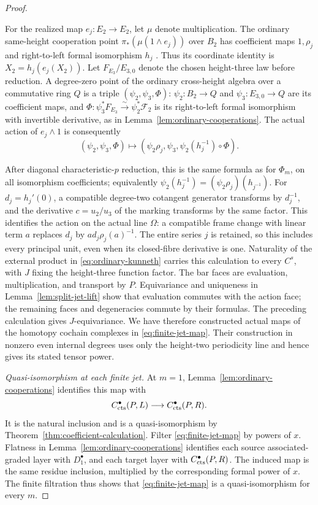 \begin{proof}
\begin{samepage}
For the realized map \(e_j:E_2\to E_2\), let \(\mu\) denote multiplication.
The ordinary same-height cooperation point
\(\pi_*(\mu(1\wedge e_j))\) over \(B_2\) has coefficient maps
\(1,\rho_j\) and right-to-left formal isomorphism \(h_j\)
\citep[Proposition~7.3, Equation~(7.3), and Corollary~7.7]{GH04}.
Thus its coordinate identity is \(X_2=h_j(e_j(X_2))\). Let
\(F_{E_3}/E_{3,0}\) denote the chosen height-three law before reduction.
A degree-zero point of the ordinary cross-height algebra over a commutative
ring \(Q\) is a triple \((\psi_2,\psi_3,\Phi)\):
\(\psi_2:B_2\to Q\) and \(\psi_3:E_{3,0}\to Q\) are its
coefficient maps, and
\(\Phi:\psi_3^*F_{E_3}\xrightarrow{\sim}\psi_2^*\mathcal F_2\)
is its right-to-left formal isomorphism with invertible derivative, as in
Lemma~\ref{lem:ordinary-cooperations}. The actual action of
\(e_j\wedge1\) is consequently
\[
 (\psi_2,\psi_3,\Phi)\longmapsto
       (\psi_2\rho_j,\psi_3,\psi_2(h_j^{-1})\circ\Phi).
\]
\end{samepage}
After diagonal characteristic-\(p\) reduction, this is the same formula
as for \(\Phi_m\), on all isomorphism coefficients; equivalently
\(\psi_2(h_j^{-1})=(\psi_2\rho_j)(h_{j^{-1}})\).
For \(d_j=h_j'(0)\), a compatible degree-two cotangent generator
transforms by \(d_j^{-1}\), and the derivative \(c=u_2/u_3\) of the
marking transforms by the same factor. This identifies the action on
the actual line \(\Omega\): a compatible frame change with linear term
\(a\) replaces \(d_j\) by \(a d_j\rho_j(a)^{-1}\).
The entire series \(j\) is retained, so this includes every principal
unit, even when its closed-fibre derivative is one. Naturality of the
external product in \eqref{eq:ordinary-kunneth} carries this calculation
to every \(C^s\), with \(J\) fixing the height-three function factor.
The bar faces are evaluation, multiplication, and transport by $P$.
Equivariance and uniqueness in Lemma~\ref{lem:split-jet-lift} show
that evaluation commutes with the action face; the remaining faces
and degeneracies commute by their formulas.  The preceding calculation
gives $J$-equivariance.  We have therefore constructed actual maps of
the homotopy cochain complexes in \eqref{eq:finite-jet-map}.
Their construction in nonzero even internal degrees uses only the
height-two periodicity line and hence gives its stated tensor power.

\smallskip\noindent\emph{Quasi-isomorphism at each finite jet.}
At $m=1$, Lemma~\ref{lem:ordinary-cooperations} identifies this map
with
\[
  C^\bullet_{\mathrm{cts}}(P,L)\longrightarrow C^\bullet_{\mathrm{cts}}(P,R).
\]
It is the natural inclusion and is a quasi-isomorphism by
Theorem~\ref{thm:coefficient-calculation}.  Filter
\eqref{eq:finite-jet-map} by powers of $x$.  Flatness in
Lemma~\ref{lem:ordinary-cooperations} identifies each source
associated-graded layer with $D_1^\bullet$, and each target layer
with $C^\bullet_{\mathrm{cts}}(P,R)$.  The induced map is the same residue inclusion,
multiplied by the corresponding formal power of $x$.
The finite filtration thus shows that \eqref{eq:finite-jet-map}
is a quasi-isomorphism for every $m$.


\end{proof}
